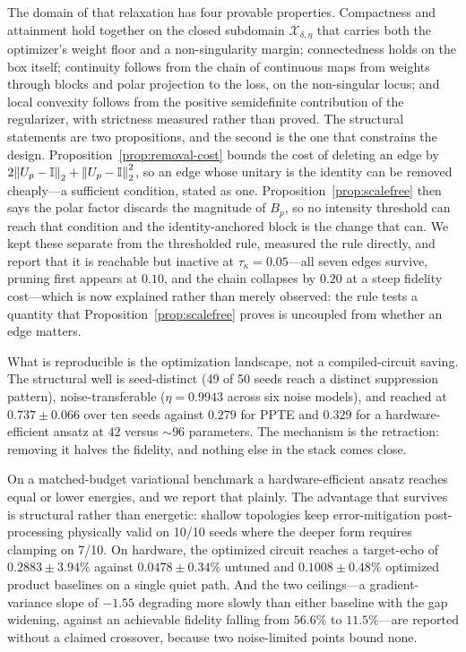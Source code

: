 \documentclass[twocolumn,aps,prl,superscriptaddress,showkeys]{revtex4-2}
\theoremstyle{plain}
\theoremstyle{definition}
\begin{document}
The domain of that relaxation has four provable properties. Compactness and attainment hold together on the closed subdomain $\mathcal{X}_{\delta,\eta}$ that carries both the optimizer's weight floor and a non-singularity margin; connectedness holds on the box itself; continuity follows from the chain of continuous maps from weights through blocks and polar projection to the loss, on the non-singular locus; and local convexity follows from the positive semidefinite contribution of the regularizer, with strictness measured rather than proved. The structural statements are two propositions, and the second is the one that constrains the design. Proposition~\ref{prop:removal-cost} bounds the cost of deleting an edge by $2\norm{U_p-\mathbb{I}}_2+\norm{U_p-\mathbb{I}}_2^2$, so an edge whose unitary is the identity can be removed cheaply---a sufficient condition, stated as one. Proposition~\ref{prop:scalefree} then says the polar factor discards the magnitude of $B_p$, so no intensity threshold can reach that condition and the identity-anchored block is the change that can. We kept these separate from the thresholded rule, measured the rule directly, and report that it is reachable but inactive at $\tau_\kappa=0.05$---all seven edges survive, pruning first appears at $0.10$, and the chain collapses by $0.20$ at a steep fidelity cost---which is now explained rather than merely observed: the rule tests a quantity that Proposition~\ref{prop:scalefree} proves is uncoupled from whether an edge matters.

What is reproducible is the optimization landscape, not a compiled-circuit saving. The structural well is seed-distinct (49 of 50 seeds reach a distinct suppression pattern), noise-transferable ($\eta=0.9943$ across six noise models), and reached at $0.737\pm0.066$ over ten seeds against $0.279$ for PPTE and $0.329$ for a hardware-efficient ansatz at $42$ versus $\sim\!96$ parameters. The mechanism is the retraction: removing it halves the fidelity, and nothing else in the stack comes close.

On a matched-budget variational benchmark a hardware-efficient ansatz reaches equal or lower energies, and we report that plainly. The advantage that survives is structural rather than energetic: shallow topologies keep error-mitigation post-processing physically valid on 10/10 seeds where the deeper form requires clamping on 7/10. On hardware, the optimized circuit reaches a target-echo of $0.2883\pm3.94\%$ against $0.0478\pm0.34\%$ untuned and $0.1008\pm0.48\%$ optimized product baselines on a single quiet path. And the two ceilings---a gradient-variance slope of $-1.55$ degrading more slowly than either baseline with the gap widening, against an achievable fidelity falling from $56.6\%$ to $11.5\%$---are reported without a claimed crossover, because two noise-limited points bound none.
\end{document}
